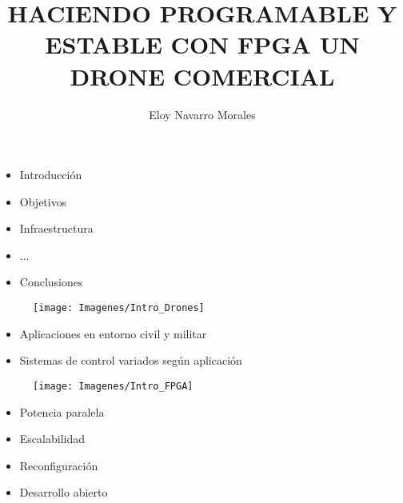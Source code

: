 \documentclass[a4,landscpae]{seminar}
\title{HACIENDO PROGRAMABLE Y ESTABLE CON FPGA UN DRONE COMERCIAL}
\author{Eloy Navarro Morales}
\begin{document}
\maketitle

\begin{hslide}
\begin{itemize}
	\item Introducci\'on
	\item Objetivos
	\item Infraestructura
	\item ...
	\item Conclusiones
\end{itemize}
\end{hslide}



\begin{hslide}
\begin{minipage}{6.1cm}
	\begin{figure}
		\texttt{[image: Imagenes/Intro\_Drones]}
	\end{figure}
\end{minipage} \hfill
\begin{minipage}{4.9cm}
	\begin{itemize}
		\item Aplicaciones en entorno civil y militar
		\item Sistemas de control variados seg\'un aplicaci\'on
	\end{itemize}
\end{minipage}

\end{hslide}
\begin{hslide}
\begin{minipage}{7cm}
	\begin{center}
		\begin{figure}
			\texttt{[image: Imagenes/Intro\_FPGA]}
		\end{figure}
	\end{center}
\end{minipage} \hfill
\begin{minipage}{3.5cm}
	\begin{itemize}
		\item Potencia paralela
		\item Escalabilidad
		\item Reconfiguraci\'on
		\item Desarrollo abierto
	\end{itemize}
\end{minipage}
\end{hslide}
\end{document}
